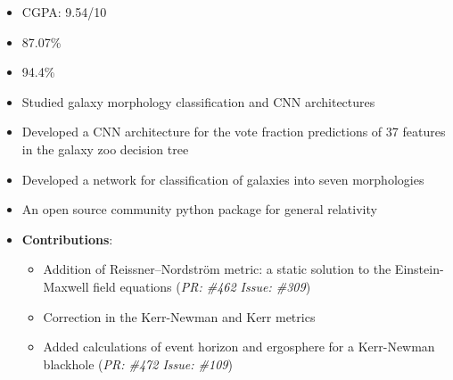 \documentclass[10pt,a4paper,ragged2e,withhyper]{altacv}
\begin{document}
\begin{paracol}{2}


\switchcolumn

\begin{itemize}
    \item CGPA: 9.54/10
\end{itemize}

\begin{itemize}
    \item 87.07\%
\end{itemize}

\begin{itemize}
    \item 94.4\%
\end{itemize}

\begin{itemize}
    \item Studied galaxy morphology classification and CNN architectures
    \item Developed a CNN architecture for the vote fraction predictions of 37 features in the galaxy zoo decision tree
    \item Developed a network for classification of galaxies into seven morphologies
\end{itemize}
\begin{itemize}
    \item An open source community python package for general relativity
    \item \textbf{Contributions}:
    \begin{itemize}
        \item Addition of  Reissner–Nordström metric: a static solution to the Einstein-Maxwell field equations (\textit{PR: \#462 Issue: \#309})
        \item Correction in the Kerr-Newman and Kerr metrics
        \item Added calculations of event horizon and ergosphere for a Kerr-Newman blackhole (\textit{PR: \#472 Issue: \#109})
    \end{itemize}
\end{itemize}
\nocite{*}
\printbibliography[heading=pubtype,title={\printinfo{\faFile*[regular]}{Journal Articles}}, type=misc]
\end{paracol}
\end{document}
